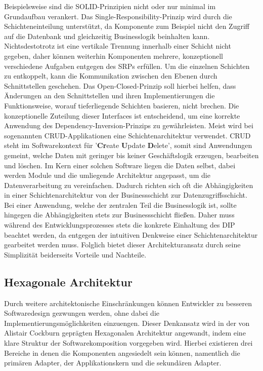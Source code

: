 Beispielsweise sind die SOLID-Prinzipien nicht oder nur minimal im Grundaufbau verankert. Das Single-Responsibility-Prinzip wird durch die Schichteneinteilung unterstützt, da Komponente zum Beispiel nicht den Zugriff auf die Datenbank und gleichzeitig Businesslogik beinhalten kann. Nichtsdestotrotz ist eine vertikale Trennung innerhalb einer Schicht nicht gegeben, daher können weiterhin Komponenten mehrere, konzeptionell verschiedene Aufgaben entgegen des SRPs erfüllen. Um die einzelnen Schichten zu entkoppelt, kann die Kommunikation zwischen den Ebenen durch Schnittstellen geschehen. Das Open-Closed-Prinzip soll hierbei helfen, dass Änderungen an den Schnittstellen und ihren Implementierungen die Funktionsweise, worauf tieferliegende Schichten basieren, nicht brechen. Die konzeptionelle Zuteilung dieser Interfaces ist entscheidend, um eine korrekte Anwendung des Dependency-Inversion-Prinzips zu gewährleisten. Meist wird bei sogenannten CRUD-Applikationen eine Schichtenarchitektur verwendet. CRUD steht im Softwarekontext für '\textbf{Cr}eate \textbf{U}pdate \textbf{D}elete', somit sind Anwendungen gemeint, welche Daten mit geringer bis keiner Geschäftslogik erzeugen, bearbeiten und löschen. Im Kern einer solchen Software liegen die Daten selbst, dabei werden Module und die umliegende Architektur angepasst, um die Datenverarbeitung zu vereinfachen. Dadurch richten sich oft die Abhängigkeiten in einer Schichtenarchitektur von der Businessschicht zur Datenzugriffsschicht. Bei einer Anwendung, welche der zentralen Teil die Businesslogik ist, sollte hingegen die Abhängigkeiten stets zur Businessschicht fließen. Daher muss während des Entwicklungsprozesses stets die konkrete Einhaltung des DIP beachtet werden, da entgegen der intuitiven Denkweise einer Schichtenarchitektur gearbeitet werden muss. Folglich bietet dieser Architekturansatz durch seine Simplizität beiderseits Vorteile und Nachteile. 


\subsection{Hexagonale Architektur}


Durch weitere architektonische Einschränkungen können Entwickler zu besseren Softwaredesign gezwungen werden, ohne dabei die Implementierungsmöglichkeiten einzuengen. Dieser Denkansatz wird in der von Alistair Cockburn geprägten Hexagonalen Architektur angewandt, indem eine klare Struktur der Softwarekomposition vorgegeben wird. Hierbei existieren drei Bereiche in denen die Komponenten angesiedelt sein können, namentlich die primären Adapter, der Applikationskern und die sekundären Adapter. 

